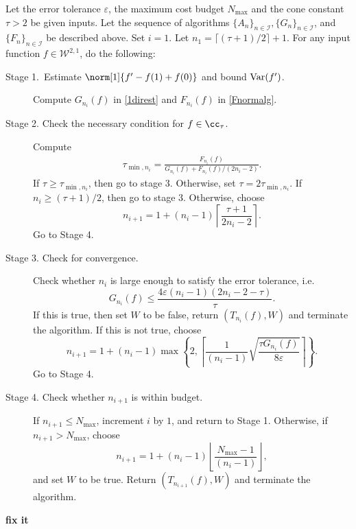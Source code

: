 \begin{algo} \label{multistageintegalgo}
Let the error tolerance $\varepsilon$, the maximum cost budget $N_{\text{max}}$ and the cone constant $\tau>2$ be given inputs. Let the sequence of algorithms $\{A_n\}_{n\in \mathcal{I}}, \{G_n\}_{n\in \mathcal{I}}$, and $\{F_n\}_{n\in \mathcal{I}}$ be described above. Set $i=1$. Let $n_1=\lceil(\tau+1)/2\rceil+1$. For any input function $f\in \mathcal{W}^{2,1}$, do the following:
\begin{description}
\item[Stage 1.\ Estimate {$\norm[1]{f'-f(1)+f(0)}$} and bound {$\operatorname{Var}(f')$}.] Compute $G_{n_i}(f)$ in \eqref{1direst} and $F_{n_i}(f)$ in \eqref{Fnormalg}.

\item[Stage 2. Check the necessary condition for $f \in \cc_{\tau}$.] Compute 
    \begin{align*}
     \tau_{\min,n_i} =  \frac{F_{n_i}(f)}{G_{n_i}(f)+F_{n_i}(f)/(2n_i-2)}.
    \end{align*}
If $\tau \ge \tau_{\min,n_i}$, then go to stage 3.  Otherwise, set $\tau = 2\tau_{\min,n_i}$.  If $n_i \ge (\tau+1)/2$, then go to stage 3.  Otherwise, choose 
$$
n_{i+1}=1+ (n_i-1)\left\lceil\frac{\tau+1}{2n_i-2}\right\rceil.
$$
Go to Stage 4.

\item[Stage 3. Check for convergence.] Check whether $n_i$ is large enough to satisfy the error tolerance, i.e.
    \begin{equation*}
     G_{n_i}(f) \le \frac{4\varepsilon(n_i-1)(2n_i-2 - \tau)}{\tau}.
    \end{equation*}
If this is true, then set $W$ to be false, return $(T_{n_i}(f),W)$ and terminate the algorithm.   If this is not true, choose
$$
n_{i+1}=1+ (n_i-1)\max\left\{2,\left\lceil\frac{1}{(n_i-1)}\sqrt{\frac{\tau G_{n_i}(f)}{8\varepsilon}}\right\rceil\right\}.
$$
Go to Stage 4.

\item[Stage 4. Check whether $n_{i+1}$ is within budget.] If $n_{i+1} \le N_{\max}$, increment $i$ by $1$, and return to Stage 1.  Otherwise, if $n_{i+1} > N_{\max}$, choose 
$$
n_{i+1}=1+ (n_i-1)\left\lfloor\frac{N_{\max}-1}{(n_i-1)}\right\rfloor,
$$
and set $W$ to be true. Return $(T_{n_{i+1}}(f),W)$ and terminate the algorithm.
\end{description}
\end{algo}

{\bf fix it}

